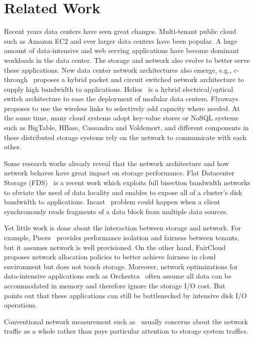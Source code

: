 \section{Related Work}
Recent years data centers have seen great changes. Multi-tenant public cloud such as Amazon EC2 and ever larger data centers have been popular. A huge amount of data-intensive and web serving applications have become dominant workloads in the data center. The storage and network also evolve to better serve these applications. New data center network architectures also emerge, e.g., c-through~\cite{c-through} proposes a hybrid packet and circuit switched network architecture to supply high bandwidth to applications. Helios~\cite{helios} is a hybrid electrical/optical switch architecture to ease the deployment of modular data centers. Flyaways~\cite{flyaways} proposes to use the wireless links to selectively add capacity where needed. At the same time, many cloud systems adopt key-value stores or NoSQL systems such as BigTable, HBase, Cassandra and Voldemort, and different components in these distributed storage systems rely on the network to communicate with each other.

Some research works already reveal that the network architecture and how network behaves have great impact on storage performance. Flat Datacenter Storage (FDS)~\cite{flat-datacenter-storage} is a recent work which exploits full bisection bandwidth networks to obviate the need of data locality and enables to expose all of a cluster's disk bandwidth to applications. Incast~\cite{incast} problem could happen when a client synchronously reads fragments of a data block from multiple data sources.

Yet little work is done about the interaction between storage and network. For example, Pisces~\cite{pisces} provides performance isolation and fairness between tenants, but it assumes network is well provisioned. On the other hand, FairCloud~\cite{faircloud} proposes network allocation policies to better achieve fairness in cloud environment but does not touch storage. Moreover, network optimizations for data-intensive applications such as Orchestra~\cite{orchestra} often assume all data can be accommodated in memory and therefore ignore the storage I/O cost. But ~\cite{c-through} points out that these applications can still be bottlenecked by intensive disk I/O operations.

Conventional network measurement such as~\cite{wild} usually concerns about the network traffic as a whole rather than pays particular attention to storage system traffics.
